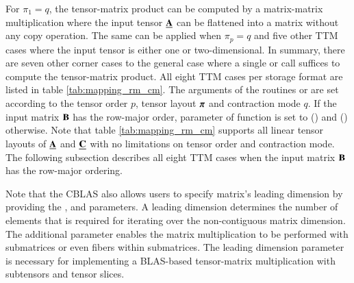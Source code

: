 For $\pi_1 = q$, the tensor-matrix product can be computed by a matrix-matrix multiplication where the input tensor $\underline{\mathbf{A}}$ can be flattened into a matrix without any copy operation.
The same can be applied when $\pi_p = q$ and five other TTM cases where the input tensor is either one or two-dimensional.
In summary, there are seven other corner cases to the general case where a single  or  call suffices to compute the tensor-matrix product.
All eight TTM cases per storage format are listed in table \ref{tab:mapping_rm_cm}.
The arguments of the routines  or  are set according to the tensor order $p$, tensor layout $\boldsymbol{\pi}$ and contraction mode $q$.
If the input matrix $\mathbf{B}$ has the row-major order, parameter  of function  is set to  () and  () otherwise.
Note that table \ref{tab:mapping_rm_cm} supports all linear tensor layouts of $\underline{\mathbf{A}}$ and $\underline{\mathbf{C}}$ with no limitations on tensor order and contraction mode.
The following subsection describes all eight TTM cases when the input matrix $\mathbf{B}$ has the row-major ordering.

Note that the CBLAS also allows users to specify matrix's leading dimension by providing the ,  and  parameters.
A leading dimension determines the number of elements that is required for iterating over the non-contiguous matrix dimension.
The additional parameter enables the matrix multiplication to be performed with submatrices or even fibers within submatrices.
The leading dimension parameter is necessary for implementing a BLAS-based tensor-matrix multiplication with subtensors and tensor slices.




